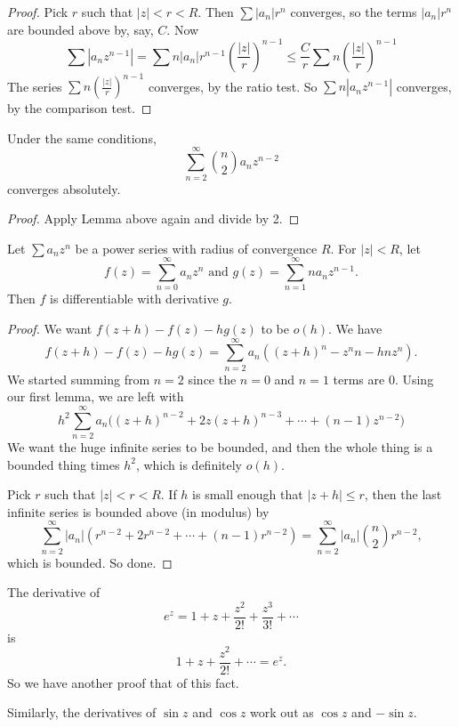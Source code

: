 \documentclass[a4paper]{article}
\begin{document}
\begin{proof}
  Pick $r$ such that $|z| < r < R$. Then $\sum |a_n| r^n$ converges, so the terms $|a_n|r^n$ are bounded above by, say, $C$. Now
  \[
    \sum |a_n z^{n - 1}| = \sum n|a_n|r^{n - 1}\left(\frac{|z|}{r}\right)^{n - 1} \leq \frac{C}{r}\sum n\left(\frac{|z|}{r}\right)^{n - 1}
  \]
  The series $\sum n\left(\frac{|z|}{r}\right)^{n - 1}$ converges, by the ratio test. So $\sum n|a_n z^{n - 1}|$ converges, by the comparison test.
\end{proof}

\begin{cor}
  Under the same conditions,
  \[
    \sum_{n = 2}^\infty \binom{n}{2}a_n z^{n -2 }
  \]
  converges absolutely.
\end{cor}

\begin{proof}
  Apply Lemma above again and divide by 2.
\end{proof}

\begin{thm}
  Let $\sum a_n z^n$ be a power series with radius of convergence $R$. For $|z| < R$, let
  \[
    f(z) = \sum_{n = 0}^\infty a_n z^n\text{ and }g(z) = \sum_{n = 1}^\infty na_nz^{n - 1}.
  \]
  Then $f$ is differentiable with derivative $g$.
\end{thm}

\begin{proof}
  We want $f(z + h) - f(z) - hg(z)$ to be $o(h)$. We have
  \[
    f(z + h) - f(z) - hg(z) = \sum_{n = 2}^\infty a_n ((z + h)^n - z^nn - hnz^n).
  \]
  We started summing from $n = 2$ since the $n = 0$ and $n = 1$ terms are 0. Using our first lemma, we are left with
  \[
    h^2\sum_{n = 2}^\infty a_n \big((z + h)^{n - 2} + 2z(z + h)^{n - 3} + \cdots + (n - 1)z^{n - 2}\big)
  \]
  We want the huge infinite series to be bounded, and then the whole thing is a bounded thing times $h^2$, which is definitely $o(h)$.

  Pick $r$ such that $|z| < r < R$. If $h$ is small enough that $|z + h| \leq r$, then the last infinite series is bounded above (in modulus) by
  \[
    \sum_{n = 2}^\infty|a_n|(r^{n - 2} + 2r^{n - 2} + \cdots + (n - 1)r^{n - 2}) = \sum_{n = 2}^\infty |a_n|\binom{n}{2}r^{n -2 },
  \]
  which is bounded. So done.
\end{proof}

\begin{eg}
  The derivative of
  \[
    e^z = 1 + z + \frac{z^2}{2!} + \frac{z^3}{3!} + \cdots
  \]
  is
  \[
    1 + z + \frac{z^2}{2!} + \cdots = e^z.
  \]
  So we have another proof that of this fact.

  Similarly, the derivatives of $\sin z$ and $\cos z$ work out as $\cos z$ and $-\sin z$.
\end{eg}
\end{document}
